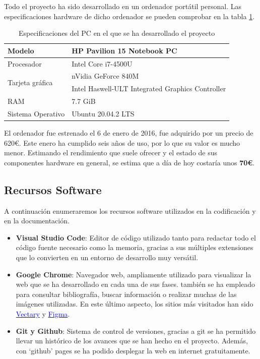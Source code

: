 Todo el proyecto ha sido desarrollado en un ordenador portátil personal. Las especificaciones hardware de dicho ordenador se pueden comprobar en la tabla \ref{tabla:especificaciones-PC}.
\begin{table}[ht]
    \centering
    \begin{tabular}{ll}
    \hline
    Modelo                           & HP Pavilion 15 Notebook PC                       \\ \hline
    Procesador                       & Intel Core i7-4500U                              \\ \hline
    \multirow{2}{*}{Tarjeta gráfica} & nVidia GeForce 840M                              \\
                                     & Intel Haswell-ULT Integrated Graphics Controller \\ \hline
    RAM                              & 7.7 GiB                                          \\ \hline
    Sistema Operativo                & Ubuntu 20.04.2 LTS                               \\ \hline
    \end{tabular}
    \caption{Especificaciones del PC en el que se ha desarrollado el proyecto}
    \label{tabla:especificaciones-PC}
    \end{table}


El ordenador fue estrenado el 6 de enero de 2016, fue adquirido por un precio de 620€. Este enero ha cumplido seis años de uso, por lo que su valor es mucho menor. Estimando el rendimiento que suele ofrecer y el estado de sus componentes hardware en general, se estima que a día de hoy costaría unos \textbf{70€}.

\subsection*{Recursos Software}

A continuación enumeraremos los recursos software utilizados en la codificación y en la documentación.

\begin{itemize}
    \item \textbf{Visual Studio Code}: Editor de código utilizado tanto para redactar todo el código fuente necesario como la memoria, gracias a sus múltiples extensiones que lo convierten en un entorno de desarrollo muy versátil.
    \item \textbf{Google Chrome}: Navegador web, ampliamente utilizado para visualizar la web que se ha desarrollado en cada una de sus fases. también se ha empleado para consultar bibliografía, buscar información o realizar muchas de las imágenes utilizadas. En este último aspecto, los sitios más visitados han sido \href{https://www.vectary.com/}{\textcolor{blue}{Vectary}} y  \href{https://www.figma.com/}{\textcolor{blue}{Figma}}.
    \item \textbf{Git y Github}: Sistema de control de versiones, gracias a git se ha permitido llevar un histórico de los avances que se han hecho en el proyecto. Además, con `github' pages se ha podido desplegar la web en internet gratuitamente.
\end{itemize}

